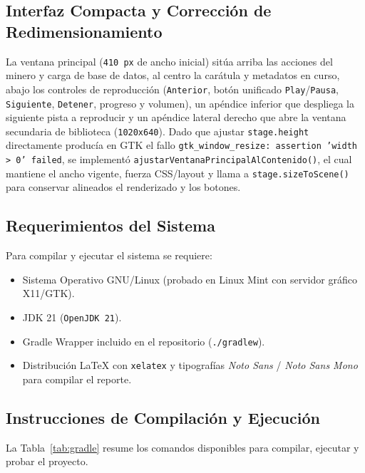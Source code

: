 \documentclass[12pt,a4paper]{article}
\begin{document}
\subsection{Interfaz Compacta y Corrección de Redimensionamiento}
La ventana principal (\texttt{410 px} de ancho inicial) sitúa arriba las acciones del minero y carga de base de datos, al centro la carátula y metadatos en curso, abajo los controles de reproducción (\texttt{Anterior}, botón unificado \texttt{Play}/\texttt{Pausa}, \texttt{Siguiente}, \texttt{Detener}, progreso y volumen), un apéndice inferior que despliega la siguiente pista a reproducir y un apéndice lateral derecho que abre la ventana secundaria de biblioteca (\texttt{1020x640}). Dado que ajustar \texttt{stage.height} directamente producía en GTK el fallo \texttt{gtk\_window\_resize: assertion 'width > 0' failed}, se implementó \texttt{ajustarVentanaPrincipalAlContenido()}, el cual mantiene el ancho vigente, fuerza CSS/layout y llama a \texttt{stage.sizeToScene()} para conservar alineados el renderizado y los botones.

\subsection{Requerimientos del Sistema}
Para compilar y ejecutar el sistema se requiere:
\begin{itemize}
    \item Sistema Operativo GNU/Linux (probado en Linux Mint con servidor gráfico X11/GTK).
    \item JDK 21 (\texttt{OpenJDK 21}).
    \item Gradle Wrapper incluido en el repositorio (\texttt{./gradlew}).
    \item Distribución LaTeX con \texttt{xelatex} y tipografías \textit{Noto Sans} / \textit{Noto Sans Mono} para compilar el reporte.
\end{itemize}

\subsection{Instrucciones de Compilación y Ejecución}
La Tabla~\ref{tab:gradle} resume los comandos disponibles para compilar, ejecutar y probar el proyecto.
\end{document}

